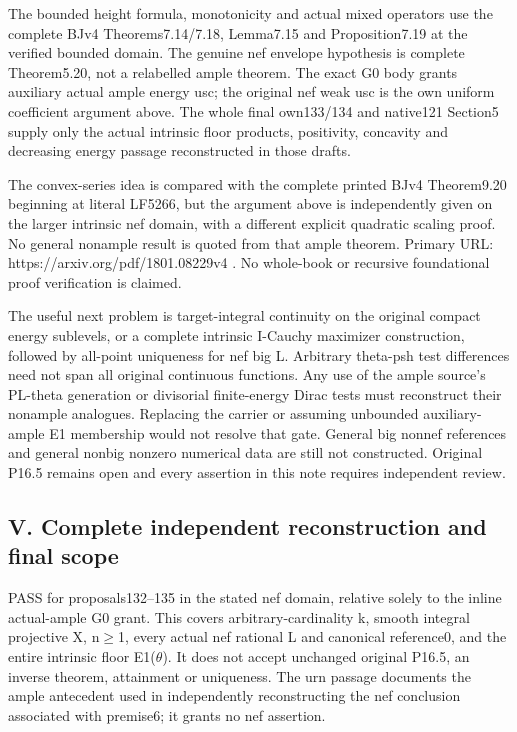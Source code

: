 \documentclass[
]{article}
\begin{document}
The bounded height formula, monotonicity and actual mixed operators use
the complete BJv4 Theorems7.14/7.18, Lemma7.15 and Proposition7.19 at
the verified bounded domain. The genuine nef envelope hypothesis is
complete Theorem5.20, not a relabelled ample theorem. The exact G0 body
grants auxiliary actual ample energy usc; the original nef weak usc is
the own uniform coefficient argument above. The whole final own133/134
and native121 Section5 supply only the actual intrinsic floor products,
positivity, concavity and decreasing energy passage reconstructed in
those drafts.

The convex-series idea is compared with the complete printed BJv4
Theorem9.20 beginning at literal LF5266, but the argument above is
independently given on the larger intrinsic nef domain, with a different
explicit quadratic scaling proof. No general nonample result is quoted
from that ample theorem. Primary URL: https://arxiv.org/pdf/1801.08229v4
. No whole-book or recursive foundational proof verification is claimed.

The useful next problem is target-integral continuity on the original
compact energy sublevels, or a complete intrinsic I-Cauchy maximizer
construction, followed by all-point uniqueness for nef big L. Arbitrary
theta-psh test differences need not span all original continuous
functions. Any use of the ample source's PL-theta generation or
divisorial finite-energy Dirac tests must reconstruct their nonample
analogues. Replacing the carrier or assuming unbounded auxiliary-ample
E1 membership would not resolve that gate. General big nonnef references
and general nonbig nonzero numerical data are still not constructed.
Original P16.5 remains open and every assertion in this note requires
independent review.

\subsection{V. Complete independent reconstruction and final
scope}\label{v.-complete-independent-reconstruction-and-final-scope}

PASS for proposals132--135 in the stated nef domain, relative solely to
the inline actual-ample G0 grant. This covers arbitrary-cardinality k,
smooth integral projective X, n\ensuremath{\geq}1, every actual nef rational L and
canonical reference0, and the entire intrinsic floor E1(\ensuremath{\theta}). It does not
accept unchanged original P16.5, an inverse theorem, attainment or
uniqueness. The urn passage documents the ample antecedent used in
independently reconstructing the nef conclusion associated with
premise6; it grants no nef assertion.
\end{document}

